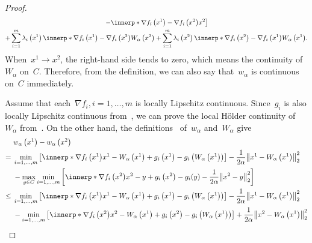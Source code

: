 \documentclass[../../main]{subfiles}
\begin{document}
\begin{proof}
\begin{multline}
            \left. - \innerp*{\nabla f_i\left(x^1\right) - \nabla f_i\left(x^2\right)}{x^2} \right] \\
        + \sum_{i = 1}^{m} \lambda_i\left(x^1\right) \innerp*{\nabla f_i\left(x^1\right) - \nabla f_i\left(x^2\right)}{W_\alpha\left(x^2\right)}
        + \sum_{i = 1}^{m} \lambda_i\left(x^2\right) \innerp*{\nabla f_i\left(x^2\right) - \nabla f_i\left(x^1\right)}{W_\alpha\left(x^1\right)}
        .\end{multline}
    When~$x^1 \to x^2$, the right-hand side tends to zero, which means the continuity of~$W_\alpha$ on~$C$.
    Therefore, from the definition, we can also say that~$w_\alpha$ is continuous on~$C$ immediately.

    Assume that each~$\nabla f_i, i = 1, \dots, m$ is locally Lipschitz continuous.
    Since~$g_i$ is also locally Lipschitz continuous from~, we can prove the local H\"older continuity of~$W_\alpha$ from~.
    On the other hand, the definitions~ of~$w_\alpha$ and~$W_\alpha$ give
    \begin{align}
              & w_\alpha\left(x^1\right) - w_\alpha\left(x^2\right)                                                                                                                                                                                           \\
        ={}   & \min_{i = 1, \dots, m} \left[ \innerp*{\nabla f_i\left(x^1\right)}{x^1 - W_\alpha\left(x^1\right)} + g_i\left(x^1\right) - g_i\left(W_\alpha\left(x^1\right)\right) \right] - \frac{1}{2 \alpha} \norm*{x^1 - W_\alpha\left(x^1\right)}_2^2   \\
              & - \max_{y \in C} \min_{i = 1, \dots, m} \left[ \innerp*{\nabla f_i\left(x^2\right)}{x^2 - y} + g_i\left(x^2\right) - g_i(y) - \frac{1}{2 \alpha} \norm*{x^2 - y}_2^2 \right]                                                                  \\
        \le{} & \min_{i = 1, \dots, m} \left[ \innerp*{\nabla f_i\left(x^1\right)}{x^1 - W_\alpha\left(x^1\right)} + g_i\left(x^1\right) - g_i\left(W_\alpha\left(x^1\right)\right) \right] - \frac{1}{2 \alpha} \norm*{x^1 - W_\alpha\left(x^1\right)}_2^2   \\
              & - \min_{i = 1, \dots, m} \left[ \innerp*{\nabla f_i\left(x^2\right)}{x^2 - W_\alpha\left(x^1\right)} + g_i\left(x^2\right) - g_i\left(W_\alpha\left(x^1\right)\right) \right] + \frac{1}{2 \alpha} \norm*{x^2 - W_\alpha\left(x^1\right)}_2^2 \\

\end{align}
\end{proof}
\end{document}
